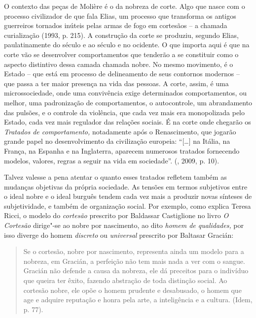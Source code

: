 O contexto das peças de Molière é o da nobreza de corte. Algo que nasce
com o processo civilizador de que fala Elias, um processo que transforma
os antigos guerreiros tornados inúteis pelas armas de fogo em cortesãos
-- a chamada curialização (1993, p. 215). A construção da corte se
produziu, segundo Elias, paulatinamente do século  e  ao século
 e  no ocidente. O que importa aqui é que na corte vão se
desenvolver comportamentos que tenderão a se constituir como o aspecto
distintivo dessa camada chamada nobre. No mesmo movimento, é o Estado --
que está em processo de delineamento de seus contornos modernos -- que passa a ter maior
presença na vida das pessoas. A corte, assim, é uma microssociedade,
onde uma convivência exige determinados comportamentos, ou melhor, uma
padronização de comportamentos, o autocontrole, um abrandamento das
pulsões, e o controle da violência, que cada vez mais era monopolizada
pelo Estado, cada vez mais regulador das relações sociais. É na corte
onde chegarão os \emph{Tratados de comportamento,} notadamente após o
Renascimento, que jogarão grande papel no desenvolvimento da civilização
europeia: ``[\ldots{}] na Itália, na França, na Espanha e na
Inglaterra, aparecem numerosos tratados fornecendo modelos, valores,
regras a seguir na vida em sociedade''. (, 2009, p. 10).

Talvez valesse a pena atentar o quanto esses tratados refletem também as
mudanças objetivas da própria sociedade. As tensões em termos subjetivos
entre o ideal nobre e o ideal burguês tendem cada vez mais a produzir
novas sínteses de subjetividade, e também de organização social. Por
exemplo, como explica Teresa Ricci, o modelo do \emph{cortesão}
prescrito por Baldassar Castiglione no livro \emph{O Cortesão} dirige"-se
ao nobre por nascimento, ao dito \emph{homem de qualidades,} por isso
diverge do homem \emph{discreto} ou \emph{universal} prescrito por
Baltasar Gracián:

\begin{quote}
Se o cortesão, nobre por nascimento, representa ainda um modelo para a
nobreza, em Gracián, a perfeição não tem mais nada a ver com o sangue.
Gracián não defende a causa da nobreza, ele dá preceitos para o
indivíduo que queira ter êxito, fazendo abstração de toda distinção
social. Ao cortesão nobre, ele opõe o homem prudente e desabusado, o
homem que age e adquire reputação e honra pela arte, a inteligência e a
cultura. (Idem, p. 77).
\end{quote}

